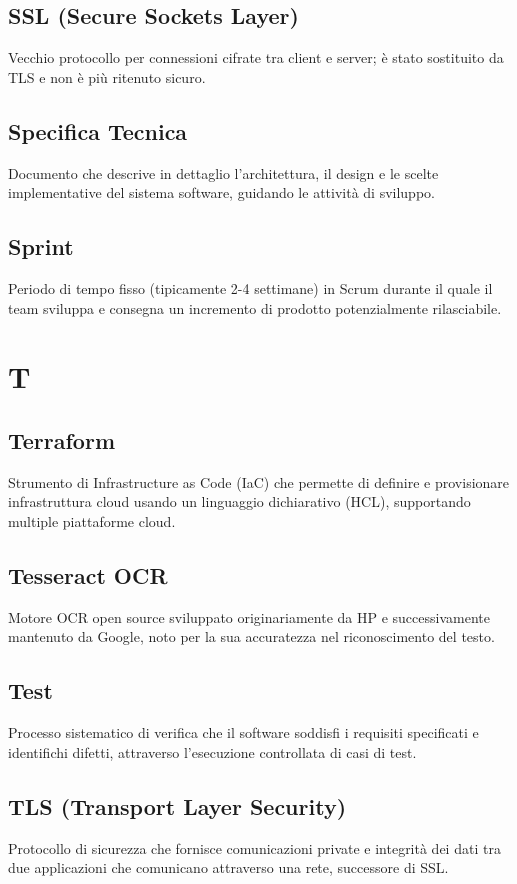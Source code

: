 \documentclass[a4paper,11pt]{article}
\begin{document}
\subsection{SSL (Secure Sockets Layer)}
Vecchio protocollo per connessioni cifrate tra client e server; è stato sostituito da TLS e non è più ritenuto sicuro.

\subsection{Specifica Tecnica}
Documento che descrive in dettaglio l'architettura, il design e le scelte implementative del sistema software, guidando le attività di sviluppo.

\subsection{Sprint}
Periodo di tempo fisso (tipicamente 2-4 settimane) in Scrum durante il quale il team sviluppa e consegna un incremento di prodotto potenzialmente rilasciabile.

\newpage
\section{T}

\subsection{Terraform}
Strumento di Infrastructure as Code (IaC) che permette di definire e provisionare infrastruttura cloud usando un linguaggio dichiarativo (HCL), supportando multiple piattaforme cloud.

\subsection{Tesseract OCR}
Motore OCR open source sviluppato originariamente da HP e successivamente mantenuto da Google, noto per la sua accuratezza nel riconoscimento del testo.

\subsection{Test}
Processo sistematico di verifica che il software soddisfi i requisiti specificati e identifichi difetti, attraverso l'esecuzione controllata di casi di test.

\subsection{TLS (Transport Layer Security)}
Protocollo di sicurezza che fornisce comunicazioni private e integrità dei dati tra due applicazioni che comunicano attraverso una rete, successore di SSL.
\end{document}
